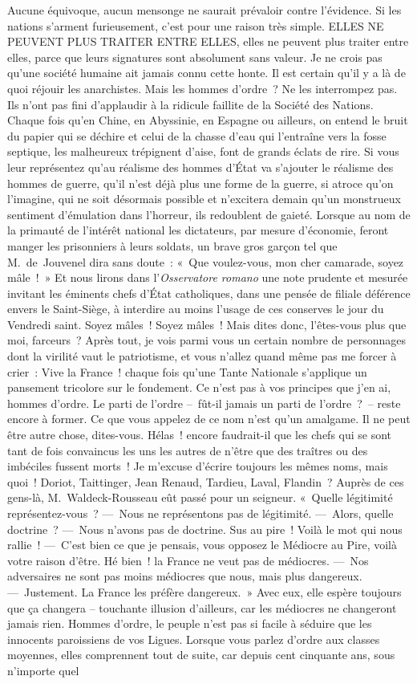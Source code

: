 \documentclass[french,twoside]{book} %
\begin{document}
Aucune équivoque, aucun mensonge ne saurait prévaloir contre l’évidence. Si les nations s’arment furieusement, c’est pour une raison très simple. ELLES NE PEUVENT PLUS TRAITER ENTRE ELLES, elles ne peuvent plus traiter entre elles, parce que leurs signatures sont absolument sans valeur. Je ne crois pas qu’une société humaine ait jamais connu cette honte. Il est certain qu’il y a là de quoi réjouir les anarchistes. Mais les hommes d’ordre ? Ne les interrompez pas. Ils n’ont pas fini d’applaudir à la ridicule faillite de la Société des Nations. Chaque fois qu’en Chine, en Abyssinie, en Espagne ou ailleurs, on entend le bruit du papier qui se déchire et celui de la chasse d’eau qui l’entraîne vers la fosse septique, les malheureux trépignent d’aise, font de grands éclats de rire. Si vous leur représentez qu’au réalisme des hommes d’État va s’ajouter le réalisme des hommes de guerre, qu’il n’est déjà plus une forme de la guerre, si atroce qu’on l’imagine, qui ne soit désormais possible et n’excitera demain qu’un monstrueux sentiment d’émulation dans l’horreur, ils redoublent de gaieté. Lorsque au nom de la primauté de l’intérêt national les dictateurs, par mesure d’économie, feront manger les prisonniers à leurs soldats, un brave gros garçon tel que M. de Jouvenel dira sans doute : « Que voulez-vous, mon cher camarade, soyez mâle ! » Et nous lirons dans l’\emph{Osservatore romano} une note prudente et mesurée invitant les éminents chefs d’État catholiques, dans une pensée de filiale déférence envers le Saint-Siège, à interdire au moins l’usage de ces conserves le jour du Vendredi saint. Soyez mâles ! Soyez mâles ! Mais dites donc, l’êtes-vous plus que moi, farceurs ? Après tout, je vois parmi vous un certain nombre de personnages dont la virilité vaut le patriotisme, et vous n’allez quand même pas me forcer à crier : Vive la France ! chaque fois qu’une Tante Nationale s’applique un pansement tricolore sur le fondement. Ce n’est pas à vos principes que j’en ai, hommes d’ordre. Le parti de l’ordre – fût-il jamais un parti de l’ordre ? – reste encore à former. Ce que vous appelez de ce nom n’est qu’un amalgame. Il ne peut être autre chose, dites-vous. Hélas ! encore faudrait-il que les chefs qui se sont tant de fois convaincus les uns les autres de n’être que des traîtres ou des imbéciles fussent morts ! Je m’excuse d’écrire toujours les mêmes noms, mais quoi ! Doriot, Taittinger, Jean Renaud, Tardieu, Laval, Flandin ? Auprès de ces gens-là, M. Waldeck-Rousseau eût passé pour un seigneur. « Quelle légitimité représentez-vous ? — Nous ne représentons pas de légitimité. — Alors, quelle doctrine ? — Nous n’avons pas de doctrine. Sus au pire ! Voilà le mot qui nous rallie ! — C’est bien ce que je pensais, vous opposez le Médiocre au Pire, voilà votre raison d’être. Hé bien ! la France ne veut pas de médiocres. — Nos adversaires ne sont pas moins médiocres que nous, mais plus dangereux. — Justement. La France les préfère dangereux. » Avec eux, elle espère toujours que ça changera – touchante illusion d’ailleurs, car les médiocres ne changeront jamais rien. Hommes d’ordre, le peuple n’est pas si facile à séduire que les innocents paroissiens de vos Ligues. Lorsque vous parlez d’ordre aux classes moyennes, elles comprennent tout de suite, car depuis cent cinquante ans, sous n’importe quel 
\end{document}
